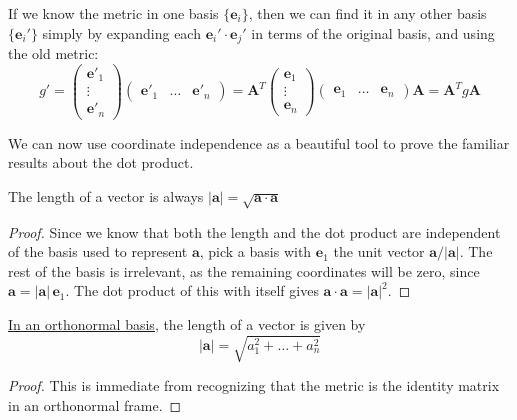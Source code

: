\documentclass[../master.tex]{subfiles}
\begin{document}
	If we know the metric in one basis $\{\mathbf e_i\}$, then we can find it in any other basis $\{\mathbf e_i'\}$ simply by expanding each $\mathbf e_i' \cdot \mathbf e_j'$ in terms of the original basis, and using the old metric:
	\begin{equation*}
		g' = 
		\begin{pmatrix}
			\mathbf e'_1\\
			\vdots\\
			\mathbf e'_n
		\end{pmatrix}
		\begin{pmatrix}
			\mathbf e'_1 & \dots & \mathbf e'_n
		\end{pmatrix} 
		= \mathbf A^T
		\begin{pmatrix}
			\mathbf e_1\\
			\vdots\\
			\mathbf e_n
		\end{pmatrix}
		\begin{pmatrix}
			\mathbf e_1 & \dots & \mathbf e_n
		\end{pmatrix} 
		\mathbf A
		= \mathbf A^T g \mathbf A
	\end{equation*}
	
	We can now use coordinate independence as a beautiful tool to prove the familiar results about the dot product.
	\begin{prop}
		The length of a vector is always $|\mathbf a| = \sqrt{\mathbf a \cdot \mathbf a}$
	\end{prop}
	\begin{proof}
		Since we know that both the length and the dot product are independent of the basis used to represent $\mathbf a$, pick a basis with $\mathbf e_1$ the unit vector $\mathbf a/|\mathbf a|$. The rest of the basis is irrelevant, as the remaining coordinates will be zero, since $\mathbf a = |\mathbf a|\, \mathbf e_1$. The dot product of this with itself gives $\mathbf a \cdot \mathbf a = |\mathbf a|^2$.
	\end{proof}
	\begin{cor}
		\ul{In an orthonormal basis}, the length of a vector is given by
		\begin{equation}
			|\mathbf a| = \sqrt{a_1^2 + \dots + a_n^2}
		\end{equation}
	\end{cor}
	\begin{proof}
		This is immediate from recognizing that the metric is the identity matrix in an orthonormal frame.
	\end{proof}
\end{document}
